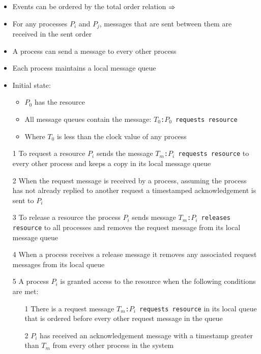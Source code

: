 \documentclass[a4paper]{article}
\begin{document}

\begin{itemize}
  \item Events can be ordered by the total order relation $\Rightarrow$
  \item For any processes $P_{i}$ and $P_{j}$, messages that are sent between
        them are received in the sent order
  \item A process can send a message to every other process
  \item Each process maintains a local message queue
  \item Initial state:
    \begin{itemize}
      \item $P_{0}$ has the resource
      \item All message queues contain the message: \texttt{$T_{0}$:$P_{0}$
            requests resource}
      \item Where $T_{0}$ is less than the clock value of any process
    \end{itemize}
\end{itemize}


\begin{enumerate}
  \item[1] To request a resource $P_{i}$ sends the message
           \texttt{$T_{m}$:$P_{i}$ requests resource} to every other process and
           keeps a copy in its local message queue
  \item[2] When the request message is received by a process, assuming the
           process has not already replied to another request a timestamped
           acknowledgement is sent to $P_{i}$
  \item[3] To release a resource the process $P_{i}$ sends message
           \texttt{$T_{m}$:$P_{i}$ releases resource} to all processes and
           removes the request message from its local message queue
  \item[4] When a process receives a release message it removes any associated
           request messages from its local queue
  \item[5] A process $P_{i}$ is granted access to the resource when the
           following conditions are met:
    \begin{enumerate}
      \item[1] There is a request message \texttt{$T_{m}$:$P_{i}$ requests
               resource} in its local queue that is ordered before every other
               request message in the queue
      \item[2] $P_{i}$ has received an acknowledgement message with a timestamp
               greater than $T_{m}$ from every other process in the system
    \end{enumerate}
\end{enumerate}
\end{document}
